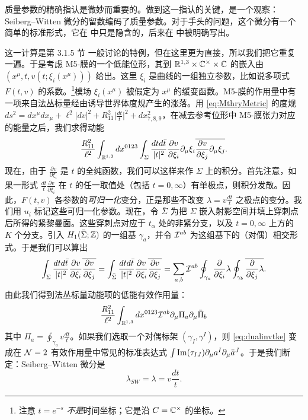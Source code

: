 质量参数的精确指认是微妙而重要的。做到这一指认的关键，是一个观察：Seiberg–Witten 微分的留数编码了质量参数。对于手头的问题，这个微分有一个简单的标准形式，它在 \cite{Witten:1997sc} 中只是隐含的，后来在 \cite{Fayyazuddin:1997by,Henningson:1997hy,Mikhailov:1997jv} 中被明确写出。

这一计算是第 3.1.5 节%
一般讨论的特例，但在这里更为直接，所以我们把它重复一遍。于是考虑 M5-膜的一个低能位形，其到 $\mathbb{R}^{1,3}\times \mathbb{C}^\times \times \mathbb{C}$ 的嵌入由 $(x^\mu, t, v(t;\xi_i(x^\mu) ))$ 给出。这里 $\xi_i$ 是曲线的一组独立参数，比如说多项式 $F(t,v)$ 的系数。\footnote{注意 $t = e^{-s}$ \emph{不是}时间坐标；它是沿 $C = \mathbb{C}^\times$ 的坐标。}模场 $\xi_i(x^\mu)$ 被假定为 $x^\mu$ 的缓变函数。M5-膜的作用量中有一项来自法丛标量经由诱导世界体度规产生的涨落。用 \eqref{eq:MthryMetric} 的度规 $ds^2 = dx^\mu dx_\mu + \ell^2 \vert dv\vert^2 + R_{11}^2 \vert \frac{dt}{t} \vert^2 + dx^2_{7,8,9}$，在减去参考位形中 M5-膜张力对应的能量之后，我们求得动能
\begin{equation}\label{eq:KEreduxii}
\frac{R_{11}^2}{\ell^2} \int_{\mathbb{R}^{1,3}} dx^{0123}\int_{\Sigma}
\frac{dt d \bar t}{\vert t\vert^2} \frac{\partial v }{\partial \xi_i} \partial_\mu
\xi_i \overline{ \frac{\partial v }{\partial \xi_j} \partial_\mu \xi_j }.
\end{equation}
现在，由于 $\frac{\partial v }{\partial \xi_i}$ 是 $t$ 的全纯函数，我们可以这样来作 $\Sigma$ 上的积分。首先注意，如果一形式 $\frac{dt}{t}\frac{\partial v }{\partial \xi_i}$ 在 $t$ 的任一取值处（包括 $t=0, \infty$）有单极点，则积分发散。因此，$F(t,v)$ 各参数的\emph{可归一化}变分，正是那些不改变 $\lambda = v \frac{dt}{t}$ 之极点的变分。我们用 $u_i$ 标记这些可归一化参数。现在，令 $\bar \Sigma$ 为把 $\Sigma$ 嵌入射影空间并填上穿刺点后所得的紧黎曼面。这些穿刺点对应于 $t_\alpha$ 处的非紧分支，以及 $t=0,\infty$ 上方的 $K$ 个分支。引入 $H_1(\bar \Sigma;\mathbb{Z})$ 的一组基 $\gamma_a$，并令 $\mathcal{I}^{ab}$ 为这组基下的（对偶）相交形式。于是我们可以算出
\begin{equation}
\label{eq:periods-intersection}
\int_{\Sigma} \frac{dt d \bar t}{\vert t\vert^2} \frac{\partial v }{\partial
\xi_i}   \overline{ \frac{\partial v }{\partial \xi_j}  }= \int_{\bar\Sigma}
\frac{dt d \bar t}{\vert t\vert^2} \frac{\partial v }{\partial \xi_i} \overline{
\frac{\partial v }{\partial \xi_j}  }=\sum_{a,b} \mathcal{I}^{ab} \oint_{\gamma_a}
\frac{\partial   }{\partial \xi_i}\lambda \oint_{\gamma_b} \overline{\frac{\partial
}{\partial \xi_j}\lambda }.
\end{equation}
由此我们得到法丛标量动能项的低能有效作用量：
\begin{equation}\label{eq:dualinvtke}
\frac{R_{11}^2}{\ell^2} \int_{\mathbb{R}^{1,3}} dx^{0123} \mathcal{I}^{ab} \partial_\mu
\Pi_a \partial_\mu \bar \Pi_b
\end{equation}
其中 $\Pi_a = \oint_{\gamma_a} v \frac{dt}{t}  $。如果我们选取一个对偶标架 $(\gamma_I, \gamma^I)$，则 \eqref{eq:dualinvtke} 变成在 $\mathcal{N}=2$ 有效作用量中常见的标准表达式 $\int {\rm Im}(\tau_{IJ}) \partial_\mu a^I \partial_\mu \bar a^J$。于是我们断定：Seiberg–Witten 微分是
\begin{equation}
\label{eq:SWdifferential}
\lambda_{SW} = \lambda = v \frac{dt}{t}.
\end{equation}

